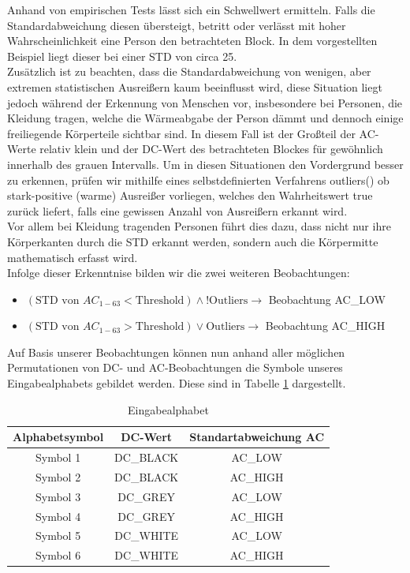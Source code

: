 Anhand von empirischen Tests lässt sich ein Schwellwert ermitteln.
Falls die Standardabweichung diesen übersteigt, betritt oder verlässt mit hoher Wahrscheinlichkeit eine Person den betrachteten Block.
In dem vorgestellten Beispiel liegt dieser bei einer STD von circa 25.\\
Zusätzlich ist zu beachten, dass die Standardabweichung von wenigen, aber extremen statistischen Ausreißern kaum beeinflusst wird, diese Situation liegt  jedoch während der Erkennung von Menschen vor, insbesondere bei Personen, die Kleidung tragen, welche die Wärmeabgabe der Person dämmt und dennoch einige freiliegende Körperteile sichtbar sind.
In diesem Fall ist der Großteil der AC-Werte relativ klein und der DC-Wert des betrachteten Blockes für gewöhnlich innerhalb des grauen Intervalls.
Um in diesen Situationen den Vordergrund besser zu erkennen, prüfen wir mithilfe eines selbstdefinierten Verfahrens outliers() ob stark-positive (warme) Ausreißer vorliegen, welches den Wahrheitswert true zurück liefert, falls eine gewissen Anzahl von Ausreißern erkannt wird.\\
Vor allem bei Kleidung tragenden Personen führt dies dazu, dass nicht nur ihre Körper\-kanten durch die STD erkannt werden, sondern auch die Körpermitte mathematisch erfasst wird.\\
Infolge dieser Erkenntnise bilden wir die zwei weiteren Beobachtungen:
\begin{itemize}
	\item $(\text{STD von }AC_{1-63} < \text{Threshold} ) \wedge !\text{Outliers} \rightarrow$  Beobachtung AC\_LOW
	\item $(\text{STD von }AC_{1-63} > \text{Threshold} ) \vee \text{Outliers} \rightarrow$  Beobachtung AC\_HIGH
\end{itemize}
Auf Basis unserer Beobachtungen können nun anhand aller möglichen Permutationen von DC- und AC-Beobachtungen die Symbole unseres Eingabealphabets gebildet werden. Diese sind in Tabelle \ref{table:eingabealphabet} dargestellt.
\begin{table}
	\label{table:eingabealphabet}
	\begin{center}
\begin{tabular}{|c|c|c|}
\hline
\textbf{Alphabetsymbol}&\textbf{DC-Wert}&\textbf{Standartabweichung AC}\\
\hline
Symbol 1&DC\_BLACK&AC\_LOW\\
\hline
Symbol 2&DC\_BLACK&AC\_HIGH\\
\hline
Symbol 3&DC\_GREY&AC\_LOW\\
\hline
Symbol 4&DC\_GREY&AC\_HIGH\\
\hline
Symbol 5&DC\_WHITE&AC\_LOW\\
\hline
Symbol 6&DC\_WHITE&AC\_HIGH\\
\hline
\end{tabular}
	\caption{Eingabealphabet}
\end{center}
\end{table}

